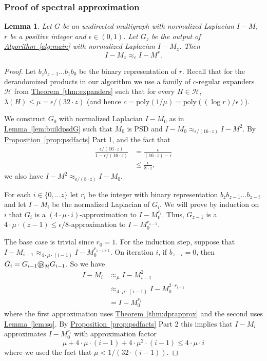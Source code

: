 \documentclass[11pt]{article}
\numberwithin{equation}{section}
\newtheorem{lemma}[theorem]{Lemma}
\theoremstyle{definition}
\theoremstyle{plain}
\newcommand{\expref}[2]{\hyperref[#2]{#1~\ref{#2}}}
\newcommand{\dpr}{\text{\textcircled{p}}_{\mathcal{H}}}
\numberwithin{myalgctr}{section}
\theoremstyle{named}
\begin{document}
%
\subsubsection{Proof of spectral approximation}
\begin{lemma}
\label{lem:pf_of_spec_approx}
Let $G$ be an undirected multigraph with normalized Laplacian $I-M$, $r$ be a positive integer and $\epsilon\in(0,1)$. Let $G_z$ be the output of \expref{Algorithm}{alg:main} with normalized Laplacian $I-M_z$. Then
\[
I-M_z \approx_{\epsilon} I-M^r.
\]
\end{lemma}
\begin{proof}
Let $b_zb_{z-1}\ldots b_1 b_0$ be the binary representation of $r$. Recall that for the derandomized products in our algorithm we use a family of $c$-regular expanders $\mathcal{H}$ from \expref{Theorem}{thm:expanders} such that for every $H\in\mathcal{H}$, $\lambda(H)\leq\mu=\epsilon/(32\cdot z)$ (and hence $c=\mathrm{poly}(1/\mu)=\mathrm{poly}((\log r)/\epsilon)$).

We construct $G_0$ with normalized Laplacian $I-M_0$ as in \expref{Lemma}{lem:buildpsdG} such that $M_0$ is PSD and $I-M_0 \approx_{\epsilon/(16\cdot z)}I-M^2$. By \expref{Proposition}{prop:psdfacts} Part 1, and the fact that 
\begin{align*}
\frac{\epsilon/(16\cdot z)}{1-\epsilon/(16\cdot z)}&=\frac{\epsilon}{(16\cdot z)-\epsilon}\\
&\leq \frac{\epsilon}{8\cdot z},
\end{align*}
we also have $I-M^2 \approx_{\epsilon/(8\cdot z)}I-M_0$.  

For each $i\in\{0,\ldots z\}$ let $r_i$ be the integer with binary representation $b_zb_{z-1}\ldots b_{z-i}$ and let $I-M_i$ be the normalized Laplacian of $G_i$. We will prove by induction on $i$ that $G_i$ is a $(4\cdot\mu\cdot i)$-approximation to $I-M_0^{r_i}$. Thus, $G_{z-1}$ is a $4\cdot\mu\cdot(z-1)\leq \epsilon/8$-approximation to $I-M_0^{r_{z-1}}$.

The base case is trivial since $r_0=1$. For the induction step, suppose that $I-M_{i-1}\approx_{4\cdot\mu\cdot (i-1)}I-M_{0}^{r_{z-i+1}}$. On iteration $i$, if $b_{z-i}=0$, then $G_{i}=G_{i-1}\dpr G_{i-1}$. So we have 
\begin{align*}
I-M_i &\approx_{\mu} I-M_{i-1}^2 \\
&\approx_{4\cdot\mu\cdot (i-1)} I-M_{0}^{2\cdot r_{i-1}}\\
&=I-M_0^{r_{i}}
\end{align*}
where the first approximation uses \expref{Theorem}{thm:dprapprox} and the second uses \expref{Lemma}{lem:sq}. By \expref{Proposition}{prop:psdfacts} Part 2 this implies that $I-M_i$ approximates $I-M_0^{r_{i}}$ with approximation factor 
\[
\mu +4\cdot\mu\cdot (i-1)+4\cdot\mu^2\cdot (i-1)\leq 4\cdot\mu\cdot i
\]
where we used the fact that $\mu<1/(32\cdot (i-1))$.


\end{proof}
\end{document}
